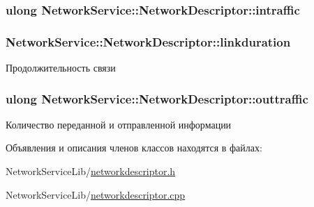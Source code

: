 \subsubsection[{intraffic}]{\setlength{\rightskip}{0pt plus 5cm}ulong Network\+Service\+::\+Network\+Descriptor\+::intraffic\hspace{0.3cm}{\ttfamily [private]}}\label{class_network_service_1_1_network_descriptor_ac4fc85cab905739a9513fcfd06ca0453}
\hypertarget{class_network_service_1_1_network_descriptor_a30c7b2914f9a815341c0d11653f378db}{}
\subsubsection[{linkduration}]{ Network\+Service\+::\+Network\+Descriptor\+::linkduration\hspace{0.3cm}{\ttfamily [private]}}\label{class_network_service_1_1_network_descriptor_a30c7b2914f9a815341c0d11653f378db}


Продолжительность связи 

\hypertarget{class_network_service_1_1_network_descriptor_a109969d9199b67144184e1b296406edc}{}
\subsubsection[{outtraffic}]{\setlength{\rightskip}{0pt plus 5cm}ulong Network\+Service\+::\+Network\+Descriptor\+::outtraffic\hspace{0.3cm}{\ttfamily [private]}}\label{class_network_service_1_1_network_descriptor_a109969d9199b67144184e1b296406edc}


Количество переданной и отправленной информации 



Объявления и описания членов классов находятся в файлах\+:\begin{DoxyCompactItemize}
\item 
Network\+Service\+Lib/\hyperlink{networkdescriptor_8h}{networkdescriptor.\+h}\item 
Network\+Service\+Lib/\hyperlink{networkdescriptor_8cpp}{networkdescriptor.\+cpp}\end{DoxyCompactItemize}
